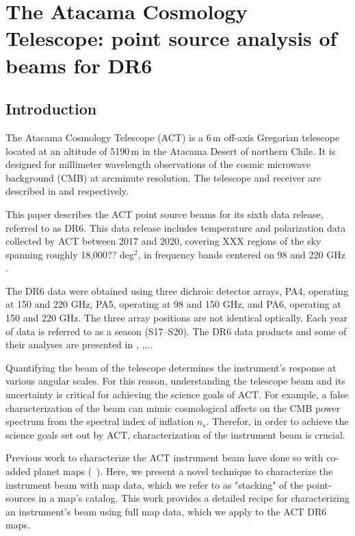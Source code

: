 \chapter{The Atacama Cosmology Telescope: point source analysis of beams for DR6}
\label{ch:actbeams}

\section{\label{sec:intro}Introduction}
\setcounter{footnote}{0}

The Atacama Cosmology Telescope (ACT) is a 6\,m off-axis Gregorian telescope located at an altitude of 5190\,m in the Atacama Desert of northern Chile. It is designed for millimeter wavelength observations of the cosmic microwave background (CMB) at arcminute resolution.  The telescope and receiver are described in \cite{fowler_2007} and \cite{thornton_2016} respectively. 

This paper describes the ACT point source beams for its sixth data release, referred to as DR6. This data release includes temperature and polarization data collected by ACT between 2017 and 2020, covering XXX regions of the sky spanning roughly 18,000?? deg$^2$, in frequency bands centered on 98 and 220 GHz \citep{thornton_2016}.

The DR6 data were obtained using three dichroic detector arrays, PA4, operating at 150 and 220 GHz, PA5, operating at 98 and 150 GHz, and PA6, operating at 150 and 220 GHz.  The three array positions are not identical optically. Each year of data is referred to as a season (S17--S20).  The DR6 data products and some of their analyses are presented in  \cite{XXX}, \cite{aiola_2020},... 

Quantifying the beam of the telescope determines the instrument's response at various angular scales.  For this reason, understanding the telescope beam and its uncertainty is critical for achieving the science goals of ACT.  For example, a false characterization of the beam can mimic cosmological affects on the CMB power spectrum from the spectral index of inflation $n_s$.  Therefor, in order to achieve the science goals set out by ACT, characterization of the instrument beam is crucial.

Previous work to characterize the ACT instrument beam have done so with co-added planet maps (~\cite{hasselfield_atacama_2013,louis_2017,naess_2014}).  Here, we present a novel technique to characterize the instrument beam with map data, which we refer to as "stacking" of the point-sources in a map's catalog.  This work provides a detailed recipe for characterizing an instrument's beam using full map data, which we apply to the ACT DR6 maps.

